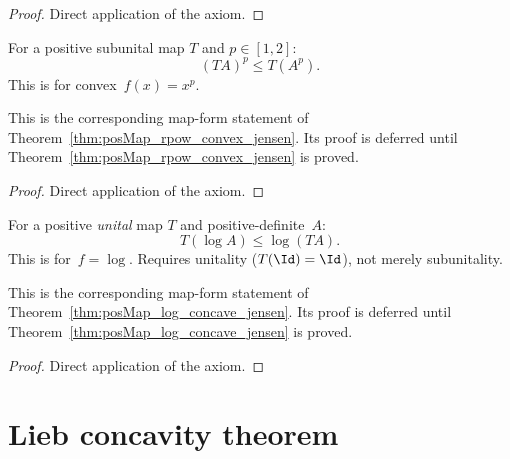 \begin{proof}
    Direct application of the axiom.
\end{proof}

\begin{theorem}\label{thm:posMap_rpow_convex_jensen}
    \notready
    For a positive subunital map $T$ and $p\in[1,2]$:
    \[
        (TA)^p \le T(A^p).
    \]
    This is \cite[Theorem~5.1]{Wolf2012Quantum} for convex~$f(x)=x^p$.
\end{theorem}

\begin{theorem}\label{thm:rpow_convex_jensen}
    \notready
    This is the corresponding map-form statement of
    Theorem~\ref{thm:posMap_rpow_convex_jensen}.
    Its proof is deferred until
    Theorem~\ref{thm:posMap_rpow_convex_jensen} is proved.
\end{theorem}

\begin{proof}
    Direct application of the axiom.
\end{proof}

\begin{theorem}\label{thm:posMap_log_concave_jensen}
    \notready
    For a positive \emph{unital} map $T$ and positive-definite~$A$:
    \[
        T(\log A) \le \log(TA).
    \]
    This is \cite[Theorem~5.1]{Wolf2012Quantum} for~$f=\log$.
    Requires unitality ($T(\Id)=\Id$), not merely subunitality.
\end{theorem}

\begin{theorem}\label{thm:log_concave_jensen}
    \notready
    This is the corresponding map-form statement of
    Theorem~\ref{thm:posMap_log_concave_jensen}.
    Its proof is deferred until
    Theorem~\ref{thm:posMap_log_concave_jensen} is proved.
\end{theorem}

\begin{proof}
    Direct application of the axiom.
\end{proof}

\section{Lieb concavity theorem}

